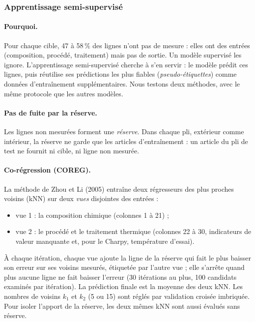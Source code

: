 
\subsubsection{Apprentissage semi-supervisé}\label{sec:semi}

\paragraph{Pourquoi.} Pour chaque cible, 47 à 58\,\% des lignes n'ont pas de mesure :
elles ont des entrées (composition, procédé, traitement) mais pas de sortie. Un modèle
supervisé les ignore. L'apprentissage semi-supervisé cherche à s'en servir : le modèle
prédit ces lignes, puis réutilise ses prédictions les plus fiables (\emph{pseudo-étiquettes})
comme données d'entraînement supplémentaires. Nous testons deux méthodes, avec le même
protocole que les autres modèles.

\paragraph{Pas de fuite par la réserve.} Les lignes non mesurées forment une
\emph{réserve}. Dans chaque pli, extérieur comme intérieur, la réserve ne garde que les
articles d'entraînement : un article du pli de test ne fournit ni cible, ni ligne non
mesurée.

\paragraph{Co-régression (COREG).} La méthode de Zhou et Li (2005) entraîne deux
régresseurs des plus proches voisins (kNN) sur deux \emph{vues} disjointes des entrées :
\begin{itemize}
  \item vue 1 : la composition chimique (colonnes 1 à 21) ;
  \item vue 2 : le procédé et le traitement thermique (colonnes 22 à 30, indicateurs de
    valeur manquante et, pour le Charpy, température d'essai).
\end{itemize}
À chaque itération, chaque vue ajoute la ligne de la réserve qui fait le plus baisser son
erreur sur ses voisins mesurés, étiquetée par l'autre vue ; elle s'arrête quand plus
aucune ligne ne fait baisser l'erreur (30 itérations au plus, 100 candidats examinés par
itération). La prédiction finale est la moyenne des deux kNN. Les nombres de voisins
$k_1$ et $k_2$ (5 ou 15) sont réglés par validation croisée imbriquée. Pour isoler
l'apport de la réserve, les deux mêmes kNN sont aussi évalués sans réserve.


